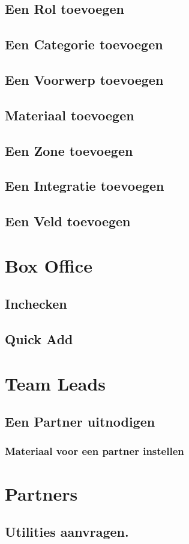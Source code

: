 \documentclass[]{memoir}
\begin{document}
\subsection{Een Rol toevoegen}
\subsection{Een Categorie toevoegen}
\subsection{Een Voorwerp toevoegen}
\subsection{Materiaal toevoegen}
\subsection{Een Zone toevoegen}
\subsection{Een Integratie toevoegen}
\subsection{Een Veld toevoegen}

\section{Box Office}
\subsection{Inchecken}
\subsection{Quick Add}

\section{Team Leads}
\subsection{Een Partner uitnodigen}
\subsubsection{Materiaal voor een partner instellen}

\section{Partners}
\subsection{Utilities aanvragen.}
\end{document}
